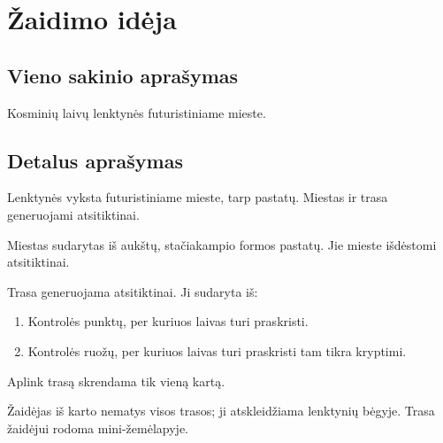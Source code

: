 \section{Žaidimo idėja}
\subsection{Vieno sakinio aprašymas}

Kosminių laivų lenktynės futuristiniame mieste.

\subsection{Detalus aprašymas}



Lenktynės vyksta futuristiniame mieste, tarp pastatų.
Miestas ir trasa generuojami atsitiktinai.


Miestas sudarytas iš aukštų, stačiakampio formos pastatų.
Jie mieste išdėstomi atsitiktinai.

Trasa generuojama atsitiktinai.
Ji sudaryta iš:
\begin{enumerate}
\item Kontrolės punktų, per kuriuos laivas turi praskristi.
\item Kontrolės ruožų, per kuriuos laivas turi praskristi tam tikra kryptimi.
\end{enumerate}
Aplink trasą skrendama tik vieną kartą.

Žaidėjas iš karto nematys visos trasos; ji atskleidžiama lenktynių bėgyje.
Trasa žaidėjui rodoma mini-žemėlapyje.

